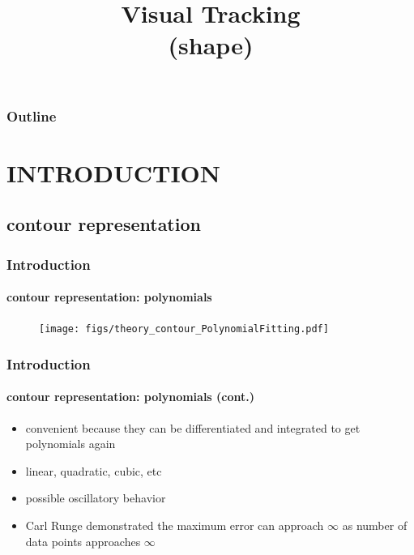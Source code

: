 
\title{Visual Tracking \\ (shape)}
\begin{frame}[plain]\logoTechTower
	\titlepage
\end{frame}

\begin{frame}
\frametitle{Outline}
\logoCSIPCPL\logoTechTower
	\setcounter{tocdepth}{1}	
	\tableofcontents
\end{frame}

\section{INTRODUCTION}

\subsection{contour representation}
\begin{frame}
\frametitle{Introduction}
\framesubtitle{contour representation: polynomials}
\logoCSIPCPL\mypagenum
	\begin{figure}
		\texttt{[image: figs/theory\_contour\_PolynomialFitting.pdf]}
	\end{figure}
\end{frame}



\begin{frame}
\frametitle{Introduction}
\framesubtitle{contour representation: polynomials (cont.)}
\logoCSIPCPL\mypagenum
	\begin{itemize}
		\item convenient because they can be differentiated and integrated to get polynomials again
		\item linear, quadratic, cubic, etc
		\item possible oscillatory behavior
		\item Carl Runge demonstrated the maximum error can approach $\infty$ as number of data points approaches $\infty$
	\end{itemize}
\end{frame}




